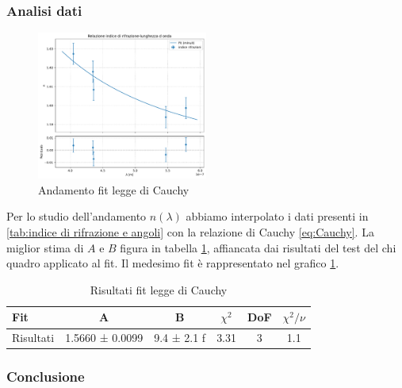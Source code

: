 \documentclass[a4paper]{article}
\begin{document}
\subsubsection{Analisi dati}

\begin{figure}[htbp]
	\centering
	\includegraphics[width=0.5\textwidth]{grafici/cauchy.pdf}
	\caption{Andamento fit legge di Cauchy}
	\label{fig:grafico cauchy}
\end{figure}

Per lo studio dell'andamento $n(\lambda)$ abbiamo interpolato i dati presenti in \ref{tab:indice di rifrazione e angoli} con la relazione di Cauchy \ref{eq:Cauchy}. La miglior stima di $A$ e $B$ figura in tabella \ref{tab:fit cauchy}, affiancata dai risultati del test del chi quadro applicato al fit.
Il medesimo fit è rappresentato nel grafico \ref{fig:grafico cauchy}.

\begin{table}[htbp]
\centering
\begin{tabular}{|l|ccccc|}
\hline
Fit & A & B & $\chi^2$ & DoF & $\chi^2/\nu$ \\\hline\hline
Risultati & 1.5660 ± 0.0099 & 9.4 ± 2.1 f & 3.31 & 3 & 1.1 \\\hline
\end{tabular}
\caption{Risultati fit legge di Cauchy}
\label{tab:fit cauchy}
\end{table}

\subsubsection{Conclusione}
\end{document}
